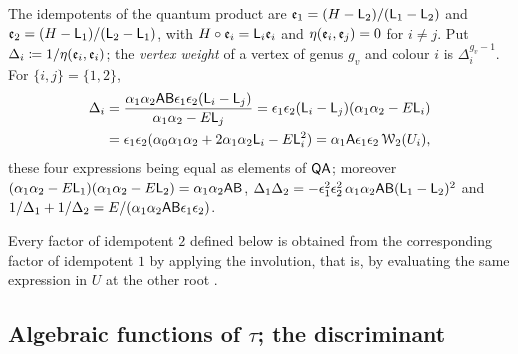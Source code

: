 \begin{prop}
\label{prop:set-idem}
The idempotents of the quantum product are $\mathfrak{e}_1=(H-\mathsf{L}_2)/(\mathsf{L}_1-\mathsf{L}_2)$ and $\mathfrak{e}_2=(H-\mathsf{L}_1)/(\mathsf{L}_2-\mathsf{L}_1)$, with $H\circ\mathfrak{e}_i=\mathsf{L}_i\mathfrak{e}_i$ and $\eta(\mathfrak{e}_i,\mathfrak{e}_j)=0$ for $i\neq j$. Put $\Delta_i\coloneqq1/\eta(\mathfrak{e}_i,\mathfrak{e}_i)$; the \emph{vertex weight} of a vertex of genus $g_v$ and colour $i$ is $\Delta_i^{g_v-1}$. For $\{i,j\}=\{1,2\}$,
\begin{equation}
\label{eq:set-Delta}
\begin{split}
\Delta_i&=\frac{\alpha_1\alpha_2\mathsf{A}\mathsf{B}\epsilon_1\epsilon_2(\mathsf{L}_i-\mathsf{L}_j)}{\alpha_1\alpha_2-E\mathsf{L}_j}
=\epsilon_1\epsilon_2(\mathsf{L}_i-\mathsf{L}_j)(\alpha_1\alpha_2-E\mathsf{L}_i)\\
&=\epsilon_1\epsilon_2(\alpha_0\alpha_1\alpha_2+2\alpha_1\alpha_2\mathsf{L}_i-E\mathsf{L}_i^2)
=\alpha_1\mathsf{A}\epsilon_1\epsilon_2\,\mathcal{W}_2(U_i),
\end{split}
\end{equation}
these four expressions being equal as elements of $\mathsf{QA}$; moreover $(\alpha_1\alpha_2-E\mathsf{L}_1)(\alpha_1\alpha_2-E\mathsf{L}_2)=\alpha_1\alpha_2\mathsf{A}\mathsf{B}$, $\Delta_1\Delta_2=-\epsilon_1^2\epsilon_2^2\,\alpha_1\alpha_2\mathsf{A}\mathsf{B}(\mathsf{L}_1-\mathsf{L}_2)^2$ and $1/\Delta_1+1/\Delta_2=E/(\alpha_1\alpha_2\mathsf{A}\mathsf{B}\epsilon_1\epsilon_2)$.
\end{prop}

Every factor of idempotent $2$ defined below is obtained from the corresponding factor of idempotent $1$ by applying the involution, that is, by evaluating the same expression in $U$ at the other root .

\subsection{Algebraic functions of \texorpdfstring{$\tau$}{tau}; the discriminant}
\label{sec:set-alg}

